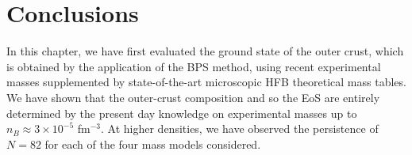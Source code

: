 
\section{Conclusions}\label{sec:conclu1}

In this chapter, we have first evaluated the ground state of the outer crust, 
which is obtained by the application of the BPS method, using recent 
experimental masses \cite{Huang2017,Welker2017} supplemented by state-of-the-art 
microscopic HFB theoretical mass tables. We have shown that the outer-crust 
composition and so the EoS are entirely determined by the present day
knowledge on experimental masses up to $n_B \approx 3\times 10^{-5}$ fm$^{-3}$.
At higher densities, we have observed the persistence of $N=82$ for each of the
four mass models considered.

